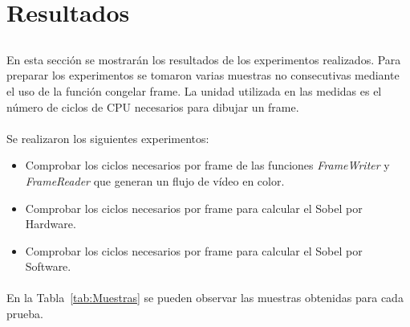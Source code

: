 \documentclass[a4paper,12pt,titlepage,final]{book}
\begin{document}
\clearpage
\section{Resultados}
\subsection*{}
\subsubsection*{}

\paragraph{}
En esta sección se mostrarán los resultados de los experimentos realizados. Para preparar los experimentos se tomaron varias muestras no consecutivas mediante el uso de la función congelar frame. La unidad utilizada en las medidas es el número de ciclos de CPU necesarios para dibujar un frame.


\paragraph{}
Se realizaron los siguientes experimentos:
\begin{itemize}
\item Comprobar los ciclos necesarios por frame de las funciones \textit{FrameWriter} y \textit{FrameReader} que generan un flujo de vídeo en color.
\item Comprobar los ciclos necesarios por frame para calcular el Sobel por Hardware.
\item Comprobar los ciclos necesarios por frame para calcular el Sobel por Software.
\end{itemize}

\paragraph{}
En la Tabla~\ref{tab:Muestras} se pueden observar las muestras obtenidas para cada prueba.
\end{document}
